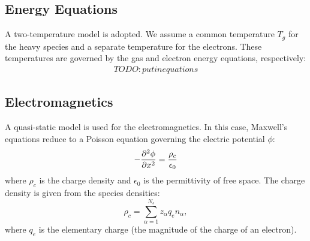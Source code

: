 \subsection{Energy Equations} \label{sec:pdes-energy}
A two-temperature model is adopted.  We assume a common temperature
$T_g$ for the heavy species and a separate temperature for the
electrons.  These temperatures are governed by the gas and electron
energy equations, respectively:
%
\begin{gather*}
TODO: put in equations
\end{gather*}
%

\subsection{Electromagnetics} \label{sec:pdes-poisson}
A quasi-static model is used for the electromagnetics.  In this case,
Maxwell's equations reduce to a Poisson equation governing the
electric potential $\phi$:
%
\begin{equation*}
-\frac{\partial ^2\phi}{\partial x^2} = \frac{\rho_c}{\epsilon_0}
\end{equation*}
%
where $\rho_c$ is the charge density and $\epsilon_0$ is the
permittivity of free space.  The charge density is given from the
species densities:
%
\begin{equation*}
\rho_c = \sum_{\alpha=1}^{N_s} z_{\alpha} q_e n_{\alpha},
\end{equation*}
%
where $q_e$ is the elementary charge (the magnitude of the charge of
an electron).
